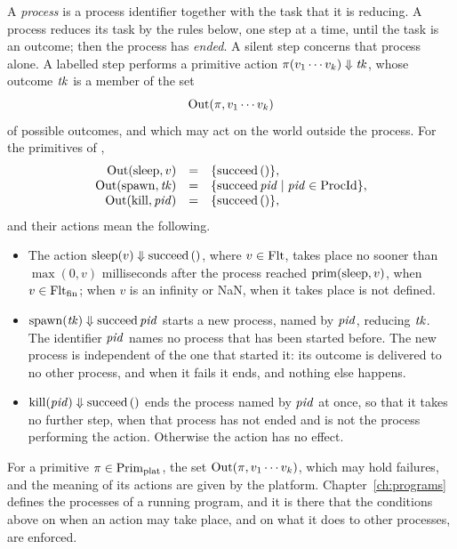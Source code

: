 A \emph{process} is a process identifier together with the task that it is
reducing. A process reduces its task by the rules below, one step at a time,
until the task is an outcome; then the process has \emph{ended}. A silent step
concerns that process alone. A labelled step performs a primitive action
$\pi(v_1\cdots v_k)\Downarrow \mathit{tk}$, whose outcome $\mathit{tk}$ is a member of the
set
\[
  \mathrm{Out}(\pi,v_1\cdots v_k)
\]
of possible outcomes, and which may act on the world outside the process. For
the primitives of ,
\[
  \begin{array}{rcl}
  \mathrm{Out}(\mathrm{sleep},v) &=& \{\mathrm{succeed}\,()\},\\
  \mathrm{Out}(\mathrm{spawn},\mathit{tk}) &=& \{\mathrm{succeed}\,\mathit{pid} \mid \mathit{pid}\in\mathrm{ProcId}\},\\
  \mathrm{Out}(\mathrm{kill},\mathit{pid}) &=& \{\mathrm{succeed}\,()\},
  \end{array}
\]
and their actions mean the following.
\begin{itemize}
\item The action $\mathrm{sleep}(v)\Downarrow \mathrm{succeed}\,()$, where
  $v\in\mathrm{Flt}$, takes place no sooner than $\max(0,v)$ milliseconds after the process reached
  $\mathrm{prim}(\mathrm{sleep},v)$, when $v\in\mathrm{Flt}_{\mathrm{fin}}$; when $v$ is an infinity or
  NaN, when it takes place is not defined. %
\item $\mathrm{spawn}(\mathit{tk})\Downarrow \mathrm{succeed}\,\mathit{pid}$ starts a new process,
  named by $\mathit{pid}$, reducing $\mathit{tk}$. The identifier $\mathit{pid}$ names no process
  that has been started before. The new process is independent of the one
  that started it: its outcome is delivered to no other process, and when it
  fails it ends, and nothing else happens. %
\item $\mathrm{kill}(\mathit{pid})\Downarrow \mathrm{succeed}\,()$ ends the process named by
  $\mathit{pid}$ at once, so that it takes no further step, when that process has not
  ended and is not the process performing the action. Otherwise the action has
  no effect. %
\end{itemize}
For a primitive $\pi\in\mathrm{Prim}_{\mathrm{plat}}$, the set $\mathrm{Out}(\pi,v_1\cdots v_k)$,
which may hold failures, and the meaning of its actions are given by the
platform. %
Chapter~\ref{ch:programs} defines the processes of a running program, and
it is there that the conditions above on when an action may take place, and
on what it does to other processes, are enforced.

